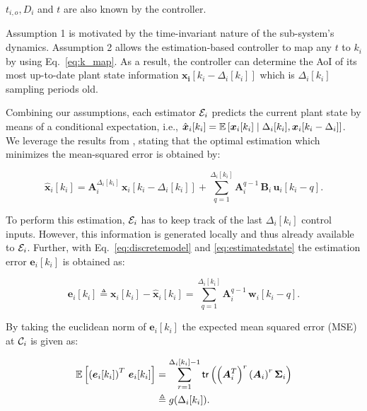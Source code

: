 \begin{theorem}
  $t_{i,o}, D_i$ and $t$ are also known by the controller. 
\end{theorem}

Assumption 1 is motivated by the time-invariant nature of the sub-system's
dynamics. Assumption 2 allows the estimation-based controller to map any $t$ to
$k_i$ by using Eq.~\eqref{eq:k_map}. As a result, the controller can determine
the AoI of its most up-to-date plant state information $\boldsymbol{x_i}[k_i -
\Delta_i[k_i]]$ which is $\Delta_i[k_i]$ sampling periods old.

Combining our assumptions, each estimator $\mathcal{E}_i$ predicts the current
plant state by means of a conditional expectation, i.e.,
$\hat{\boldsymbol{x}}_i[k_i] = \mathbb{E}\left[\boldsymbol{x}_i[k_i] \mid \Delta_i[k_i],
\boldsymbol{x}_i[k_i-\Delta_i] \right]$. We leverage the results from
\cite{ayan2019age}, stating that the optimal estimation which minimizes the
mean-squared error is obtained by:

\begin{equation}
  \label{eq:estimatedstate}
    \boldsymbol{\hat{x}}_i[k_i] = \boldsymbol{A}_i^{\Delta_i[k_i]} \,  \boldsymbol{x}_i[k_i - \Delta_i[k_i]] + \sum_{q=1}^{\Delta_i[k_i]} \boldsymbol{A}_i^{q - 1} \, \boldsymbol{B}_i \, \boldsymbol{u}_i [k_i - q].
\end{equation}

To perform this estimation, $\mathcal{E}_i$ has to keep track of the last
$\Delta_i[k_i]$ control inputs. However, this information is generated locally
and thus already available to $\mathcal{E}_i$. Further, with
Eq.~\eqref{eq:discretemodel} and \eqref{eq:estimatedstate} the estimation error
$\boldsymbol{e}_i[k_i]$ is obtained as:

\begin{equation}
  \boldsymbol{e}_i[k_i] \triangleq \boldsymbol{x}_i[k_i] - \boldsymbol{\hat{x}}_i[k_i] = \sum_{q=1}^{\Delta_i[k_i]} \boldsymbol{A}_i^{q-1} \, \boldsymbol{w}_i[k_i - q].
\end{equation}

By taking the euclidean norm of $\boldsymbol{e}_i[k_i]$ the expected mean
squared error (MSE) at $\mathcal{C}_i$ is given as:

\begin{align}
  \label{eq:estimationerror}
  \mathbb{E} \left[ \left(\boldsymbol{e}_i[k_i]\right)^T \, \boldsymbol{e}_i[k_i]\right] & = \sum_{r=1}^{\Delta_i[k_i] - 1} \mathsf{tr} \left( \left(\boldsymbol{A}_i^T\right)^r  \left(\boldsymbol{A}_i \right)^r \boldsymbol{\Sigma}_i \right) \\ \nonumber
  & \triangleq g(\Delta_i[k_i]).
\end{align}

